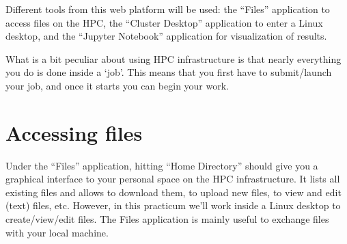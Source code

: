 \documentclass[a4paper]{article}
\begin{document}
%
\par
Different tools from this web platform will be used: the ``Files'' application to access files on the HPC, the ``Cluster Desktop'' application to enter a Linux desktop, and the ``Jupyter Notebook'' application for visualization of results.
%
\par
What is a bit peculiar about using HPC infrastructure is that nearly everything you do is done inside a `job'. This means that you first have to submit/launch your job, and once it starts you can begin your work.
%
\section{Accessing files}
%
\par
Under the ``Files'' application, hitting ``Home Directory'' should give you a graphical interface to your personal space on the HPC infrastructure. It lists all existing files and allows to download them, to upload new files, to view and edit (text) files, etc. However, in this practicum we'll work inside a Linux desktop to create/view/edit files. The Files application is mainly useful to exchange files with your local machine.
%
\end{document}

